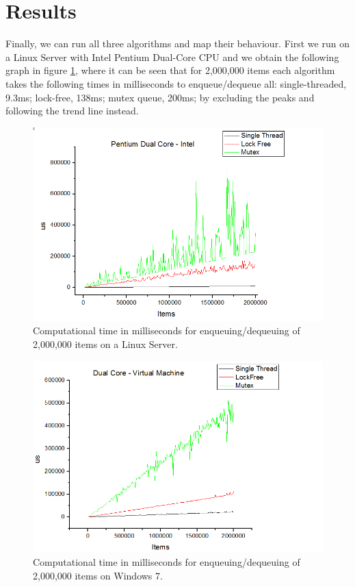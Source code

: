 \documentclass{article}
\begin{document}
\section{Results}
\label{sec:results}

Finally, we can run all three algorithms and map their behaviour. First we run on a Linux Server with Intel Pentium Dual-Core CPU and we obtain the following graph in figure \ref{fig:linux}, where it can be seen that for 2,000,000 items each algorithm takes the following times in milliseconds to enqueue/dequeue all: single-threaded, 9.3ms; lock-free, 138ms; mutex queue, 200ms; by excluding the peaks and following the trend line instead.

\begin{figure}[htp]
\includegraphics[width=120mm]{linux.png}
\caption{Computational time in milliseconds for enqueuing/dequeuing of 2,000,000 items on a Linux Server.}
\label{fig:linux}
\end{figure}

\begin{figure}[htp]
\includegraphics[width=120mm]{windows.png}
\caption{Computational time in milliseconds for enqueuing/dequeuing of 2,000,000 items on Windows 7.}
\label{fig:windows}
\end{figure}
\end{document}
